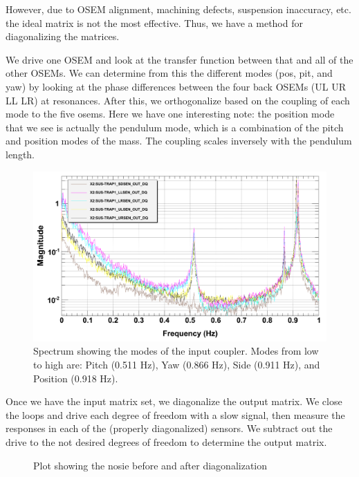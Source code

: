 However, due to OSEM alignment, machining defects, suspension inaccuracy, etc. the ideal matrix is not the most effective. Thus, we have a method for diagonalizing the matrices.

We drive one OSEM and look at the transfer function between that and all of the other OSEMs. We can determine from this the different modes (pos, pit, and yaw) by looking at the phase differences between the four back OSEMs (UL UR LL LR) at resonances. After this, we orthogonalize based on the coupling of each mode to the five osems. Here we have one interesting note: the position mode that we see is actually the pendulum mode, which is a combination of the pitch and position modes of the mass. The coupling scales inversely with the pendulum length.

\begin{figure}[p]
	\centering
		\includegraphics[width=.95\textwidth]{figures/suspensions/trap1spec.png}
	\caption[Input coupler spectrum]{Spectrum showing the modes of the input coupler.  Modes from low to high are: Pitch (0.511 Hz), Yaw (0.866 Hz), Side (0.911 Hz), and Position (0.918 Hz). }
	\label{fig:trap1spec}
\end{figure}


Once we have the input matrix set, we diagonalize the output matrix. We close the loops and drive each degree of freedom with a slow signal, then measure the responses in each of the (properly diagonalized) sensors. We subtract out the drive to the not desired degrees of freedom to determine the output matrix. 

\begin{figure}[p]
	\centering
	\caption[Diagonlization noise comparison]{Plot showing the nosie before and after diagonalization}
	\label{fig:diagNoise}
\end{figure}
